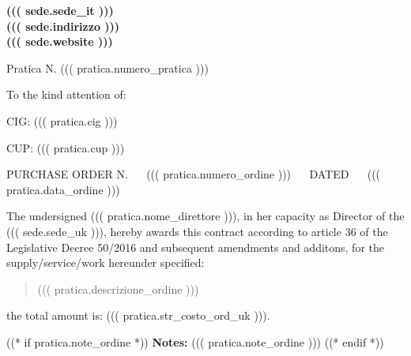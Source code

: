 \documentclass[a4paper,12pt]{letter}
\begin{document}
\vspace{-2.5cm}
\begin{center}
\small \bf
((( sede.sede_it ))) \\
((( sede.indirizzo )))  \\
((( sede.website )))
\end{center}
\thispagestyle{empty}
\vspace{1cm}
{\small Pratica N. ((( pratica.numero_pratica ))) }
\vspace{.4cm}

\begin{flushright}
\begin{minipage}{15cm}
To the kind attention of:\\
\end{minipage}
\end{flushright}
\vspace{5mm}

CIG: ((( pratica.cig ))) 

CUP: ((( pratica.cup )))

PURCHASE ORDER N. ~~ ((( pratica.numero_ordine ))) ~~ DATED ~~ ((( pratica.data_ordine )))

The undersigned ((( pratica.nome_direttore ))), in her capacity as Director of the ((( sede.sede_uk ))), hereby
awards this contract according to 
article 36 of the Legislative Decree 50/2016
and subsequent amendments and additons,
for the supply/service/work hereunder specified:

\begin{quote}
((( pratica.descrizione_ordine )))
\end{quote}

the total amount is:   
((( pratica.str_costo_ord_uk ))).

((* if pratica.note_ordine *))
{\bf Notes:} ((( pratica.note_ordine )))
((* endif *))
\vspace{1cm}
\end{document}
